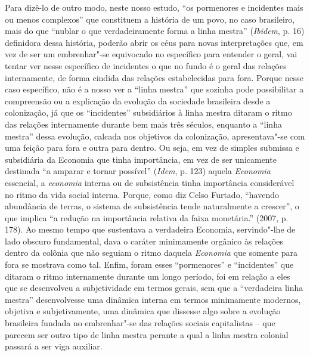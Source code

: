 Para dizê-lo de outro modo, neste nosso estudo, ``os pormenores e
incidentes mais ou menos complexos'' que constituem a história de um
povo, no caso brasileiro, mais do que ``nublar o que verdadeiramente
forma a linha mestra'' (\emph{Ibidem}, p. 16) definidora dessa história,
poderão abrir os céus para novas interpretações que, em vez de ser um
embrenhar"-se equivocado no específico para entender o geral, vai tentar
ver nesse específico de incidentes o que no fundo é o geral das relações
internamente, de forma cindida das relações estabelecidas para fora.
Porque nesse caso específico, não é a nosso ver a ``linha mestra'' que
sozinha pode possibilitar a compreensão ou a explicação da evolução da
sociedade brasileira desde a colonização, já que os ``incidentes''
subsidiários à linha mestra ditaram o ritmo das relações internamente
durante bem mais três séculos, enquanto a ``linha mestra'' dessa
evolução, calcada nos objetivos da colonização, apresentava"-se com uma
feição para fora e outra para dentro. Ou seja, em vez de simples
submissa e subsidiária da Economia que tinha importância, em vez de ser
unicamente destinada ``a amparar e tornar possível'' (\emph{Idem}, p.
123) aquela \emph{Economia} essencial, a \emph{economia} interna ou de
subsistência tinha importância considerável no ritmo da vida social
interna. Porque, como diz Celso Furtado, ``havendo abundância de terras,
o sistema de subsistência tende naturalmente a crescer'', o que implica
``a redução na importância relativa da faixa monetária.'' (2007, p.
178). Ao mesmo tempo que sustentava a verdadeira Economia, servindo"-lhe
de lado obscuro fundamental, dava o caráter minimamente orgânico às
relações dentro da colônia que não seguiam o ritmo daquela
\emph{Economia} que somente para fora se mostrava como tal. Enfim, foram
esses ``pormenores'' e ``incidentes'' que ditaram o ritmo internamente
durante um longo período, foi em relação a eles que se desenvolveu a
subjetividade em termos gerais, sem que a ``verdadeira linha mestra''
desenvolvesse uma dinâmica interna em termos minimamente modernos,
objetiva e subjetivamente, uma dinâmica que dissesse algo sobre a
evolução brasileira fundada no embrenhar"-se das relações sociais
capitalistas -- que parecem ser outro tipo de linha mestra perante a
qual a linha mestra colonial passará a ser viga auxiliar.

